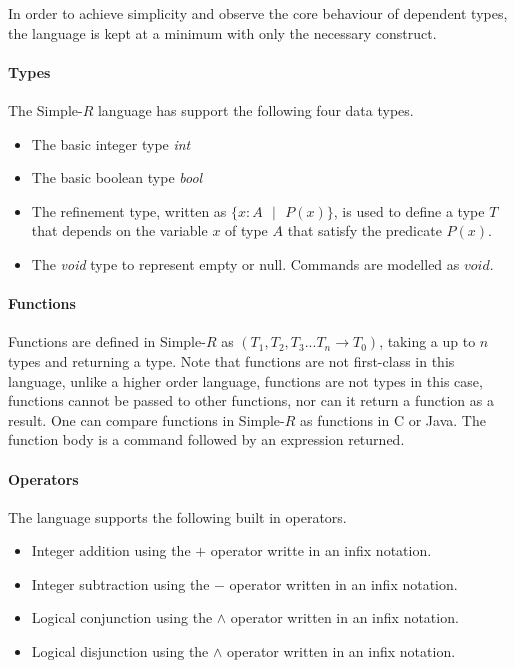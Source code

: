 \documentclass[a4paper,12pt]{report}
\begin{document}
\par
In order to achieve simplicity and observe the core behaviour of dependent 
types, the language is kept at a minimum with only the necessary construct. 

\paragraph{Types} The Simple-$R$ language has support the following four data types. 
\begin{itemize}
  \item The basic integer type \textit{int}
  \item The basic boolean type \textit{bool}
  \item The refinement type, written as $\{x: A\text{ }|\text{ }P(x)\}$, is used to 
  define a type $T$ that depends on the variable $x$ of type 
  $A$ that satisfy the predicate $P(x)$.
  \item The \textit{void} type to represent empty or null. Commands are modelled 
  as $void$.
\end{itemize}

\paragraph{Functions}
Functions are defined in Simple-$R$ as $(T_1, T_2,T_3...T_n \longrightarrow T_0)$, 
taking a up to $n$ types and returning a type. Note that functions are 
not first-class in this language, unlike a higher order 
language, functions are not types in this case, functions cannot be passed to 
other functions, nor can it return a function as a result. One can compare 
functions in Simple-$R$ as functions in C or Java. The function body is a 
command followed by an expression returned. 

\paragraph{Operators}
The language supports the following built in operators.
\begin{itemize}
  \item Integer addition using the $+$ operator writte in an infix notation.
  \item Integer subtraction using the $-$ operator written in an infix notation.
  \item Logical conjunction using the $\wedge$ operator written in an infix 
  notation.
  \item Logical disjunction using the $\wedge$ operator written in an infix 
  notation.
\end{itemize}
\end{document}
